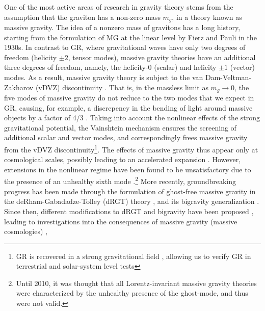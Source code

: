 \documentclass[prd,aps,psfig,nofootinbib,nobibnotes,superscriptaddress,preprintnumbers,times]{revtex4-2}\setlength{\topmargin}{-14mm}
\begin{document}
One of the most active areas of research in gravity theory stems from the assumption that the graviton has a non-zero mass $m_g$, in a theory known as massive gravity. The idea of a nonzero mass of gravitons has a long history, starting from the formulation of MG at the linear level by Fierz and Pauli \cite{Fierz:1939ix} in the 1930s. In contrast to GR, where gravitational waves have only two degrees of freedom (helicity $\pm 2$, tensor modes), massive gravity theories have an additional three degrees of freedom, namely, the helicity-$0$ (scalar) and helicity $\pm 1$ (vector) modes. As a result, massive gravity theory is subject to the van Dam-Veltman-Zakharov (vDVZ) discontinuity \cite{vanDam:1970vg,Zakharov:1970cc}. That is, in the massless limit as $m_g \rightarrow 0$, the five modes of massive gravity do not reduce to the two modes that we expect in GR, causing, for example, a discrepency in the bending of light around massive objects by a factor of 4/3 \cite{vanDam:1970vg}. Taking into account the nonlinear effects of the strong gravitational potential, the Vainshtein mechanism \cite{Vainshtein:1972sx} ensures the screening of additional scalar and vector modes, and correspondingly frees massive gravity from the vDVZ discontinuity\footnote{GR is recovered in a strong gravitational field \cite{Tasinato:2013rza}, allowing us to verify GR in terrestrial and solar-system level tests
}. The effects of massive gravity thus appear only at
cosmological scales, possibly leading to an accelerated expansion \cite{Tasinato:2012ze}.
However, extensions in the nonlinear regime have been found to be unsatisfactory due to the presence of an unhealthy sixth mode \cite{Boulware:1972yco}.\footnote{Until 2010, it was thought that all Lorentz-invariant massive gravity theories were characterized by the unhealthy presence of the ghost-mode, and thus were not valid. }
More recently, groundbreaking progress has been made through the formulation of ghost-free massive gravity in the deRham-Gabadadze-Tolley (dRGT) theory \cite{deRham:2010ik,deRham:2010kj}, and its bigravity generalization \cite{Hassan:2011zd}. Since then, different modifications to dRGT and bigravity have been proposed \cite{Hinterbichler:2011tt,deRham:2014zqa,Koyama:2015vza,deRham:2016nuf,Hinterbichler:2016try, Cusin:2016ytz}, leading to investigations into the consequences of massive gravity (massive cosmologies) 
\cite{DAmico:2011eto,Gratia:2012wt,Gumrukcuoglu:2012aa,Maeda:2013bha,Akrami:2013pna,Zhang:2013noa,Lambiase:2012fv,Koyama:2011wx,Tasinato:2012ze,Solomon:2014iwa, Akrami:2013ffa,Koennig:2014ods,Gumrukcuoglu:2016hic}, 
\end{document}
